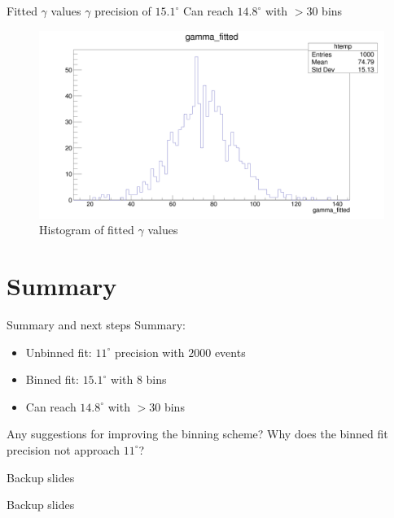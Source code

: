 \documentclass{beamer}
\begin{document}
\begin{frame}{Fitted $\gamma$ values}
  $\gamma$ precision of $15.1^\circ$
  Can reach $14.8^\circ$ with $>30$ bins
  \begin{figure}
    \centering
    \includegraphics[width = 1.0\textwidth]{OptimizedAmplitudePulls/gammafitted1K1K.png}
    \caption{Histogram of fitted $\gamma$ values}
  \end{figure}
\end{frame}

\section{Summary}
\begin{frame}{Summary and next steps}
  Summary:
  \begin{itemize}
    \item{Unbinned fit: $11^\circ$ precision with $2000$ events}
    \item{Binned fit: $15.1^\circ$ with $8$ bins}
    \item{Can reach $14.8^\circ$ with $>30$ bins}
  \end{itemize}
  Any suggestions for improving the binning scheme?
  Why does the binned fit precision not approach $11^\circ$?
\end{frame}

\begin{frame}{Backup slides}
  \begin{center}
    Backup slides
  \end{center}
\end{frame}
\end{document}
